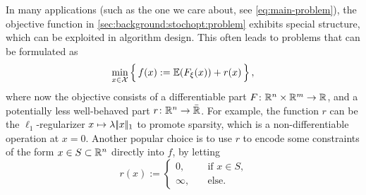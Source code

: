 In many applications (such as the one we care about, see \eqref{eq:main-problem}), the objective function in \eqref{sec:background:stochopt:problem} exhibits special structure, which
can be exploited in algorithm design. This often leads to problems that can be formulated as
\begin{equation}
    \label{eq:sec:background:stochopt:problem-with-regularizer}
    \min_{x\in\mathcal{X}} \Big\{\, f(x) := \mathbb{E}(F_\xi(x)) + r(x) \,\Big\}\,,
\end{equation}
where now the objective consists of a differentiable part $F\colon \mathbb{R}^n\times\mathbb{R}^m \to \mathbb{R}$, and a potentially less well-behaved
part $r\colon\mathbb{R}^n\to\bar{\mathbb{R}}$. For example, the function $r$ can be
the $\ell_1$-regularizer $x\mapsto \lambda |\!|x|\!|_1$ to promote sparsity, which is a non-differentiable operation at $x = 0$.
Another popular choice is to use $r$ to encode some constraints of the form $x\in S\subset\mathbb{R}^n$ directly into $f$, by letting
\[
    r(x) := \begin{cases}
        0, \quad&\text{if $x\in S$,}\\
        \infty, \quad&\text{else.}
    \end{cases}
\]

